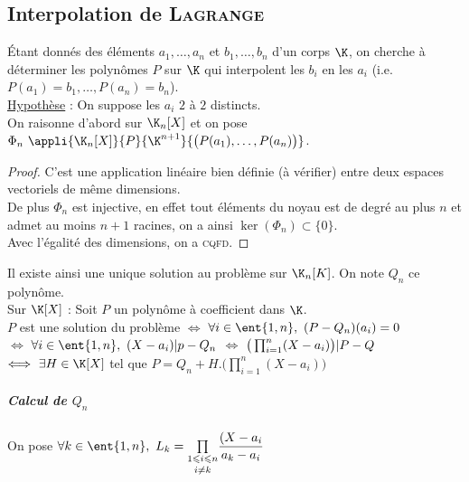 	\subsection{Interpolation de \textsc{Lagrange}}
		Étant donnés des éléments $a_1,\dots ,a_n$ et $b_1, \dots , b_n$ d'un corps $\K$, on cherche à déterminer les polynômes $P$ sur $\K$ qui interpolent les $b_i$ en les $a_i$ (i.e. $P(a_1)=b_1, \dots , P(a_n)=b_n$).\\
		\uline{Hypothèse} : On suppose les $a_i$ $2$ à $2$ distincts.\vspace*{0.5cm} \\
		On raisonne d'abord sur $\K_n[X]$ et on pose $\Phi_n ~\appli{\K_n[X]}{P}{\K^{n+1}}{\big(P(a_1),\dots ,P(a_n)\big)}$. \\
		\begin{proof}
		C'est une application linéaire bien définie (à vérifier) entre deux espaces vectoriels de même dimensions.\\
		De plus $\Phi_n$ est injective, en effet tout éléments du noyau est de degré au plus $n$ et admet au moins $n+1$ racines, on a ainsi $\ker(\Phi_n)\subset \{0\}$.\\
		Avec l'égalité des dimensions, on a \textsc{cqfd}.
		\end{proof}
		Il existe ainsi une unique solution au problème sur $\K_n[K]$. On note $Q_n$ ce polynôme.
		\vspace*{0.5cm} \\
		Sur $\K[X]$ : Soit $P$ un polynôme à coefficient dans $\K$.\vspace*{0.2cm}\\
		$P$ est une solution du problème $\Longleftrightarrow$ $\forall i\in \ent{1,n} ,~ (P-Q_n)(a_i) = 0$ \vspace*{0.2cm} \\
		$\Longleftrightarrow$ $\forall i\in\ent{1,n} ,~ (X-a_i) \vert p-Q_n$ $\Longleftrightarrow$ $ \big( \prod_{i=1}^{n} (X-a_i) \big) {\Huge\vert} P-Q$ 
		\footnotemark[1]  \vspace*{0.2cm} \\
		$\Longleftrightarrow ~ \exists H\in\K[X]$ tel que $P=Q_n + H . \big(\prod_{i=1}^{n} (X-a_i)\big) $ \vspace*{0.2cm} \\
		\subparagraph{Calcul de $Q_n$}
		On pose $\forall k\in \ent{1,n} ,~ L_k = \underset{i\neq k}{\underset{1\leqslant i\leqslant n}{\prod}} \dfrac{(X-a_i}{a_k-a_i}$\\
